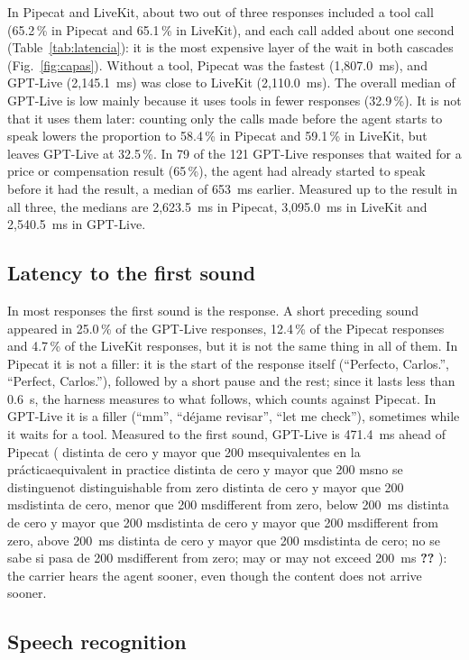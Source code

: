 \documentclass[11pt]{article}
\makeatletter
\newcommand{\RHastaResMedA}{2{,}623.5}
\newcommand{\RHastaResMedB}{3{,}095.0}
\newcommand{\RHastaResMedC}{2{,}540.5}
\newcommand{\RHerrFrac}{65}
\newcommand{\RHerrHablo}{79}
\newcommand{\RHerrMs}{653}
\newcommand{\RHerrN}{121}
\newcommand{\RPrimerDifUnoTresIc}{471.4}
\newcommand{\RPrimerDifVeredictoUnoTres}{distinta de cero y mayor que 200 ms}
\newcommand{\RPrimerFracA}{12.4}
\newcommand{\RPrimerFracB}{4.7}
\newcommand{\RPrimerFracC}{25.0}
\newcommand{\RRtFracA}{65.2}
\newcommand{\RRtFracB}{65.1}
\newcommand{\RRtFracC}{32.9}
\newcommand{\RRtFracPrevA}{58.4}
\newcommand{\RRtFracPrevB}{59.1}
\newcommand{\RRtFracPrevC}{32.5}
\newcommand{\RRtSinA}{1{,}807.0}
\newcommand{\RRtSinB}{2{,}110.0}
\newcommand{\RRtSinC}{2{,}145.1}
\newcommand{\ver@eq}{equivalentes en la práctica}
\newcommand{\ver@nd}{no se distingue}
\newcommand{\ver@menor}{distinta de cero, menor que 200 ms}
\newcommand{\ver@mayor}{distinta de cero y mayor que 200 ms}
\newcommand{\ver@cruza}{distinta de cero; no se sabe si pasa de 200 ms}
\newcommand{\verdict}[1]{%
  \ifx#1\ver@eq equivalent in practice%
  \else\ifx#1\ver@nd not distinguishable from zero%
  \else\ifx#1\ver@menor different from zero, below 200~ms%
  \else\ifx#1\ver@mayor different from zero, above 200~ms%
  \else\ifx#1\ver@cruza different from zero; may or may not exceed 200~ms%
  \else\textbf{??}\PackageWarning{paper}{Unknown verdict}%
  \fi\fi\fi\fi\fi}
\makeatother
\begin{document}
In Pipecat and LiveKit, about two out of three responses included a tool call
(\RRtFracA\,\% in Pipecat and \RRtFracB\,\% in LiveKit), and each call added about one second
(Table~\ref{tab:latencia}): it is the most expensive layer of the wait in both
cascades (Fig.~\ref{fig:capas}). Without a tool, Pipecat was the fastest (\RRtSinA~ms),
and GPT-Live (\RRtSinC~ms) was close to LiveKit (\RRtSinB~ms). The overall median of GPT-Live is
low mainly because it uses tools in fewer responses (\RRtFracC\,\%). It is not that it
uses them later: counting only the calls made before the agent starts to speak lowers
the proportion to \RRtFracPrevA\,\% in Pipecat and \RRtFracPrevB\,\% in LiveKit, but leaves
GPT-Live at \RRtFracPrevC\,\%. In \RHerrHablo{} of the \RHerrN{} GPT-Live responses that waited
for a price or compensation result (\RHerrFrac\,\%), the agent had already started to
speak before it had the result, a median of \RHerrMs~ms earlier. Measured up to the
result in all three, the medians are \RHastaResMedA~ms in Pipecat, \RHastaResMedB~ms in
LiveKit and \RHastaResMedC~ms in GPT-Live.

\subsection{Latency to the first sound}\label{sec:res-primer}

In most responses the first sound is the response. A short preceding sound
appeared in \RPrimerFracC\,\% of the GPT-Live responses, \RPrimerFracA\,\% of the Pipecat
responses and \RPrimerFracB\,\% of the LiveKit responses, but it is not the same thing in
all of them. In Pipecat it is not a filler: it is the start of the response itself
(``Perfecto, Carlos.'', ``Perfect, Carlos.''), followed by a short pause and the rest;
since it lasts less than 0.6~s, the harness measures to what follows, which counts
against Pipecat. In GPT-Live it is a filler (``mm'', ``déjame revisar'', ``let me check''),
sometimes while it waits for a tool. Measured to the first sound, GPT-Live is
\RPrimerDifUnoTresIc~ms ahead of Pipecat (\verdict{\RPrimerDifVeredictoUnoTres}): the
carrier hears the agent sooner, even though the content does not arrive sooner.

\subsection{Speech recognition}\label{sec:res-stt}
\end{document}
